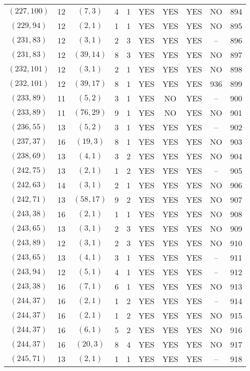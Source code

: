 \begin{longtable}{|c|c|c|c|c|c|c|c|c|c|}
$(227, 100)$ & 12 & $(7, 3)$ & 4 & 1 & YES & YES & YES & NO & 894\\
$(229, 94)$ & 12 & $(2, 1)$ & 1 & 1 & YES & YES & YES & NO & 895\\
$(231, 83)$ & 12 & $(3, 1)$ & 2 & 3 & YES & YES & YES & -- & 896\\
$(231, 83)$ & 12 & $(39, 14)$ & 8 & 3 & YES & YES & YES & NO & 897\\
$(232, 101)$ & 12 & $(3, 1)$ & 2 & 1 & YES & YES & YES & NO & 898\\
$(232, 101)$ & 12 & $(39, 17)$ & 8 & 1 & YES & YES & YES & 936 & 899\\
$(233, 89)$ & 11 & $(5, 2)$ & 3 & 1 & YES & NO & YES & -- & 900\\
$(233, 89)$ & 11 & $(76, 29)$ & 9 & 1 & YES & NO & YES & NO & 901\\
$(236, 55)$ & 13 & $(5, 2)$ & 3 & 1 & YES & YES & YES & -- & 902\\
$(237, 37)$ & 16 & $(19, 3)$ & 8 & 1 & YES & YES & YES & NO & 903\\
$(238, 69)$ & 13 & $(4, 1)$ & 3 & 2 & YES & YES & YES & NO & 904\\
$(242, 75)$ & 13 & $(2, 1)$ & 1 & 2 & YES & YES & YES & -- & 905\\
$(242, 63)$ & 14 & $(3, 1)$ & 2 & 1 & YES & YES & YES & NO & 906\\
$(242, 71)$ & 13 & $(58, 17)$ & 9 & 2 & YES & YES & YES & NO & 907\\
$(243, 38)$ & 16 & $(2, 1)$ & 1 & 1 & YES & YES & YES & NO & 908\\
$(243, 65)$ & 13 & $(3, 1)$ & 2 & 3 & YES & YES & YES & NO & 909\\
$(243, 89)$ & 12 & $(3, 1)$ & 2 & 3 & YES & YES & YES & NO & 910\\
$(243, 65)$ & 13 & $(4, 1)$ & 3 & 1 & YES & YES & YES & -- & 911\\
$(243, 94)$ & 12 & $(5, 1)$ & 4 & 1 & YES & YES & YES & -- & 912\\
$(243, 38)$ & 16 & $(7, 1)$ & 6 & 1 & YES & YES & YES & NO & 913\\
$(244, 37)$ & 16 & $(2, 1)$ & 1 & 2 & YES & YES & YES & -- & 914\\
$(244, 37)$ & 16 & $(2, 1)$ & 1 & 2 & YES & YES & YES & NO & 915\\
$(244, 37)$ & 16 & $(6, 1)$ & 5 & 2 & YES & YES & YES & NO & 916\\
$(244, 37)$ & 16 & $(20, 3)$ & 8 & 4 & YES & YES & YES & NO & 917\\
$(245, 71)$ & 13 & $(2, 1)$ & 1 & 1 & YES & YES & YES & -- & 918\\

\end{longtable}
